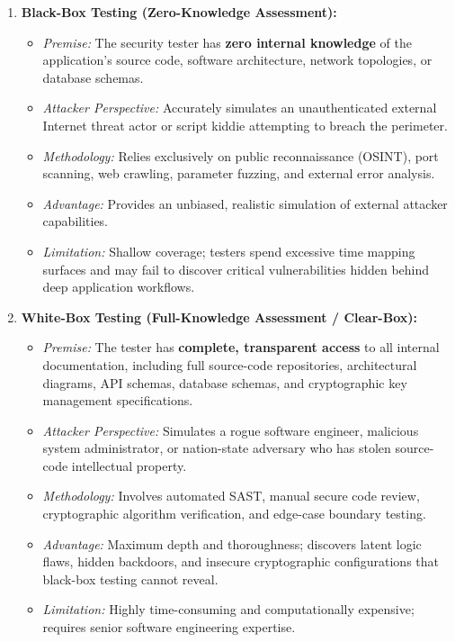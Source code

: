 \begin{enumerate}
\item \textbf{Black-Box Testing (Zero-Knowledge Assessment):}
\begin{itemize}
\item \textit{Premise:} The security tester has \textbf{zero internal knowledge} of the application's source code, software architecture, network topologies, or database schemas.
\item \textit{Attacker Perspective:} Accurately simulates an unauthenticated external Internet threat actor or script kiddie attempting to breach the perimeter.
\item \textit{Methodology:} Relies exclusively on public reconnaissance (OSINT), port scanning, web crawling, parameter fuzzing, and external error analysis.
\item \textit{Advantage:} Provides an unbiased, realistic simulation of external attacker capabilities.
\item \textit{Limitation:} Shallow coverage; testers spend excessive time mapping surfaces and may fail to discover critical vulnerabilities hidden behind deep application workflows.
\end{itemize}

\item \textbf{White-Box Testing (Full-Knowledge Assessment / Clear-Box):}
\begin{itemize}
\item \textit{Premise:} The tester has \textbf{complete, transparent access} to all internal documentation, including full source-code repositories, architectural diagrams, API schemas, database schemas, and cryptographic key management specifications.
\item \textit{Attacker Perspective:} Simulates a rogue software engineer, malicious system administrator, or nation-state adversary who has stolen source-code intellectual property.
\item \textit{Methodology:} Involves automated SAST, manual secure code review, cryptographic algorithm verification, and edge-case boundary testing.
\item \textit{Advantage:} Maximum depth and thoroughness; discovers latent logic flaws, hidden backdoors, and insecure cryptographic configurations that black-box testing cannot reveal.
\item \textit{Limitation:} Highly time-consuming and computationally expensive; requires senior software engineering expertise.
\end{itemize}


\end{enumerate}
